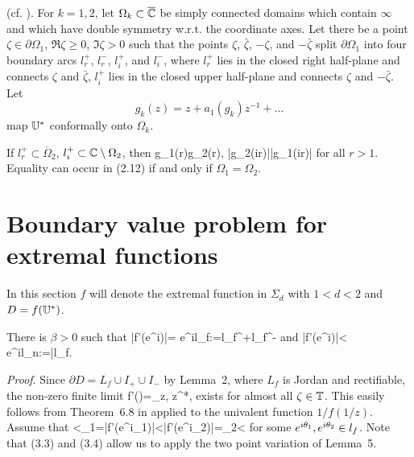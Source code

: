 \bl (cf. \cite[Lemma~1]{S1}).
For $k=1,2$, let $\Omega_k \subset \overline{{\Bbb {C}}}$ be simply connected domains which contain $\infty$ and which have double symmetry w.r.t. the coordinate axes. 
Let there be a point $\zeta\in \partial \Omega_1$, $\Re \zeta\ge 0$, $\Im \zeta>0$ such that the points $\zeta$, $\bar\zeta$, $-\zeta$, and $-\bar\zeta$
split $\partial \Omega_1$ into four boundary arcs $l_r^+$, $l_r^-$, $l_i^+$, and $l_i^-$, where $l_r^+$ lies in the closed right half-plane
and connects $\zeta$ and $\bar\zeta$, $l_i^+$ lies in the closed upper half-plane and connects $\zeta$ and $-\bar\zeta$. Let
$$
g_k(z)=z+a_1(g_k)z^{-1}+\ldots
$$
map ${\Bbb{U}}^*$ conformally onto $\Omega_k$.

If $l_r^+\subset \overline{\Omega}_2$, $l_i^+\subset {\Bbb {C}}\setminus \Omega_2$, then
\be
g_1(r)\le g_2(r), \quad |g_2(ir)|\le |g_1(ir)|
\ee
for all $r>1$. Equality  can occur in (2.12) if and only if $\Omega_1=\Omega_2$.
\el

\section{Boundary value problem for extremal functions}
\setcounter{equation}{0}



In this section $f$ will denote the extremal function in $\Sigma_d$ with $1<d<2$ and $D=f({\Bbb{U}}^*)$.

\bl
There is $\beta>0$ such that
\be
|f'(e^{i\th})|=\beta {} \quad e^{i\th}\in l_f:=l_f^+\cup l_f^-
\ee
and
\be
|f'(e^{i\th})|<\beta {} \quad e^{i\th}\in l_n:=\T\setminus \bar l_f.
\ee
\el

{\it Proof}. Since $\partial D=L_f\cup I_+\cup I_-$ by Lemma~2, where $L_f$ is Jordan and rectifiable, the non-zero finite
limit
\be
f'(\zeta)=\lim_{z\to \zeta, z\in \CU^*},\infty
\ee
exists for almost all $\zeta\in{\Bbb{T}}$. This easily follows from Theorem~6.8 in \cite{P} applied to the univalent function
$1/f(1/z)$. Assume that
<\beta_1=|f'(e^{i\th_1})|<|f'(e^{i\th_2})|=\beta_2<\infty
\ee
for some $e^{i\theta_1},e^{i\theta_2}\in l_f$. Note that (3.3) and (3.4) allow us to apply the two point variation of Lemma~5.

